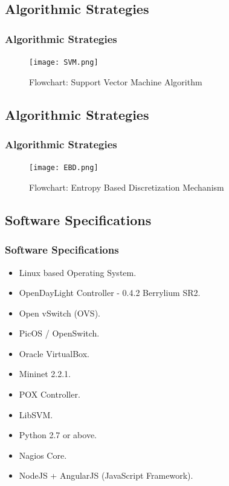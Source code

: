 \documentclass[10pt]{beamer}
\begin{document}
\begin{frame}
\section[]{Algorithmic Strategies}
\frametitle{Algorithmic Strategies}
\begin{figure}
\texttt{[image: SVM.png]}
\caption{\footnotesize Flowchart: Support Vector Machine Algorithm}
\end{figure}
\end{frame}


\begin{frame}
\section[]{Algorithmic Strategies}
\frametitle{Algorithmic Strategies}
\begin{figure}
\texttt{[image: EBD.png]}
\caption{\footnotesize Flowchart: Entropy Based Discretization Mechanism}
\end{figure}
\end{frame}

	

\begin{frame}
\section[]{Software Specifications}
\frametitle{Software Specifications}
\begin{itemize}
\footnotesize
\item
Linux based Operating System.
\item
OpenDayLight Controller - 0.4.2 Berrylium SR2.
\item
Open vSwitch (OVS).
\item
PicOS / OpenSwitch.
\item
Oracle VirtualBox.
\item
Mininet 2.2.1.
\item
POX Controller.
\item
LibSVM.
\item
Python 2.7 or above.
\item
Nagios Core.
\item
NodeJS + AngularJS (JavaScript Framework). 
\end{itemize}
\end{frame}
\end{document}
